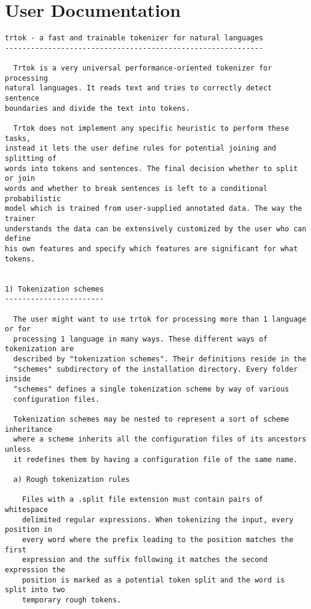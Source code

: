 \chapter{User Documentation}

\begin{tiny}
\begin{verbatim}
trtok - a fast and trainable tokenizer for natural languages
------------------------------------------------------------

  Trtok is a very universal performance-oriented tokenizer for processing
natural languages. It reads text and tries to correctly detect sentence
boundaries and divide the text into tokens.

  Trtok does not implement any specific heuristic to perform these tasks,
instead it lets the user define rules for potential joining and splitting of
words into tokens and sentences. The final decision whether to split or join
words and whether to break sentences is left to a conditional probabilistic
model which is trained from user-supplied annotated data. The way the trainer
understands the data can be extensively customized by the user who can define
his own features and specify which features are significant for what tokens.


1) Tokenization schemes
-----------------------

  The user might want to use trtok for processing more than 1 language or for
  processing 1 language in many ways. These different ways of tokenization are
  described by "tokenization schemes". Their definitions reside in the
  "schemes" subdirectory of the installation directory. Every folder inside
  "schemes" defines a single tokenization scheme by way of various
  configuration files.

  Tokenization schemes may be nested to represent a sort of scheme inheritance
  where a scheme inherits all the configuration files of its ancestors unless
  it redefines them by having a configuration file of the same name.

  a) Rough tokenization rules

    Files with a .split file extension must contain pairs of whitespace
    delimited regular expressions. When tokenizing the input, every position in
    every word where the prefix leading to the position matches the first
    expression and the suffix following it matches the second expression the
    position is marked as a potential token split and the word is split into two
    temporary rough tokens. 


\end{verbatim}
\end{tiny}
